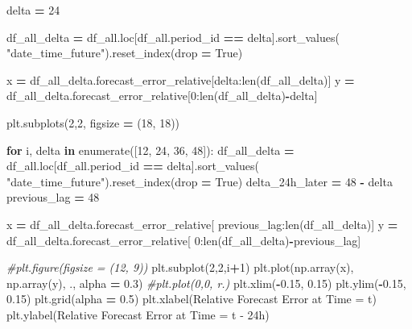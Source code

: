 \documentclass[mstat,12pt]{unswthesis}
\newenvironment{Shaded}{\begin{snugshade}}{\end{snugshade}}
\newcommand{\BuiltInTok}[1]{#1}
\newcommand{\CommentTok}[1]{\textcolor[rgb]{0.56,0.35,0.01}{\textit{#1}}}
\newcommand{\ControlFlowTok}[1]{\textcolor[rgb]{0.13,0.29,0.53}{\textbf{#1}}}
\newcommand{\DecValTok}[1]{\textcolor[rgb]{0.00,0.00,0.81}{#1}}
\newcommand{\FloatTok}[1]{\textcolor[rgb]{0.00,0.00,0.81}{#1}}
\newcommand{\KeywordTok}[1]{\textcolor[rgb]{0.13,0.29,0.53}{\textbf{#1}}}
\newcommand{\NormalTok}[1]{#1}
\newcommand{\OperatorTok}[1]{\textcolor[rgb]{0.81,0.36,0.00}{\textbf{#1}}}
\newcommand{\StringTok}[1]{\textcolor[rgb]{0.31,0.60,0.02}{#1}}
\newcommand{\VariableTok}[1]{\textcolor[rgb]{0.00,0.00,0.00}{#1}}
\begin{document}
\begin{Shaded}
\begin{Highlighting}[]
\NormalTok{delta }\OperatorTok{=} \DecValTok{24}

\NormalTok{df\_all\_delta }\OperatorTok{=}\NormalTok{ df\_all.loc[df\_all.period\_id }\OperatorTok{==}\NormalTok{ delta].sort\_values(}
    \StringTok{"date\_time\_future"}\NormalTok{).reset\_index(drop }\OperatorTok{=} \VariableTok{True}\NormalTok{)}

\NormalTok{x }\OperatorTok{=}\NormalTok{ df\_all\_delta.forecast\_error\_relative[delta:}\BuiltInTok{len}\NormalTok{(df\_all\_delta)]}
\NormalTok{y }\OperatorTok{=}\NormalTok{ df\_all\_delta.forecast\_error\_relative[}\DecValTok{0}\NormalTok{:}\BuiltInTok{len}\NormalTok{(df\_all\_delta)}\OperatorTok{{-}}\NormalTok{delta]}

\NormalTok{plt.subplots(}\DecValTok{2}\NormalTok{,}\DecValTok{2}\NormalTok{, figsize }\OperatorTok{=}\NormalTok{ (}\DecValTok{18}\NormalTok{, }\DecValTok{18}\NormalTok{))}

\ControlFlowTok{for}\NormalTok{ i, delta }\KeywordTok{in} \BuiltInTok{enumerate}\NormalTok{([}\DecValTok{12}\NormalTok{, }\DecValTok{24}\NormalTok{, }\DecValTok{36}\NormalTok{, }\DecValTok{48}\NormalTok{]):}
\NormalTok{    df\_all\_delta }\OperatorTok{=}\NormalTok{ df\_all.loc[df\_all.period\_id }\OperatorTok{==}\NormalTok{ delta].sort\_values(}
        \StringTok{"date\_time\_future"}\NormalTok{).reset\_index(drop }\OperatorTok{=} \VariableTok{True}\NormalTok{)}
\NormalTok{    delta\_24h\_later }\OperatorTok{=} \DecValTok{48} \OperatorTok{{-}}\NormalTok{ delta}
\NormalTok{    previous\_lag }\OperatorTok{=} \DecValTok{48}

\NormalTok{    x }\OperatorTok{=}\NormalTok{ df\_all\_delta.forecast\_error\_relative[}
\NormalTok{        previous\_lag:}\BuiltInTok{len}\NormalTok{(df\_all\_delta)]}
\NormalTok{    y }\OperatorTok{=}\NormalTok{ df\_all\_delta.forecast\_error\_relative[}
        \DecValTok{0}\NormalTok{:}\BuiltInTok{len}\NormalTok{(df\_all\_delta)}\OperatorTok{{-}}\NormalTok{previous\_lag]}

    \CommentTok{\#plt.figure(figsize = (12, 9))}
\NormalTok{    plt.subplot(}\DecValTok{2}\NormalTok{,}\DecValTok{2}\NormalTok{,i}\OperatorTok{+}\DecValTok{1}\NormalTok{)}
\NormalTok{    plt.plot(np.array(x), np.array(y), }\StringTok{\textquotesingle{}.\textquotesingle{}}\NormalTok{, alpha }\OperatorTok{=} \FloatTok{0.3}\NormalTok{)}
    \CommentTok{\#plt.plot(0,0, \textquotesingle{}r.\textquotesingle{})}
\NormalTok{    plt.xlim(}\OperatorTok{{-}}\FloatTok{0.15}\NormalTok{, }\FloatTok{0.15}\NormalTok{)}
\NormalTok{    plt.ylim(}\OperatorTok{{-}}\FloatTok{0.15}\NormalTok{, }\FloatTok{0.15}\NormalTok{)}
\NormalTok{    plt.grid(alpha }\OperatorTok{=} \FloatTok{0.5}\NormalTok{)}
\NormalTok{    plt.xlabel(}\StringTok{\textquotesingle{}Relative Forecast Error at Time = t\textquotesingle{}}\NormalTok{)}
\NormalTok{    plt.ylabel(}\StringTok{\textquotesingle{}Relative Forecast Error at Time = t {-} 24h\textquotesingle{}}\NormalTok{)}
\end{Highlighting}
\end{Shaded}
\end{document}
